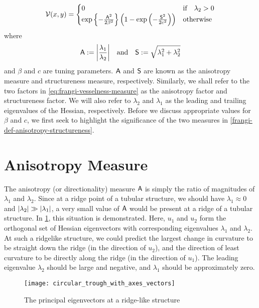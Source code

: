 \begin{equation} \label{eq:frangi-vesselness-measure}
\V(x,y) = \begin{cases}
0 & \text{if} \quad \lambda_2 > 0 \\
\exp\left\{-\frac{\Am^2}{2\beta^2}\right\}
\left(1 - \exp\left(-\frac{\Sm^2}{2c^2}\right)\right) & \text{otherwise}
\end{cases} \end{equation}
where
\begin{equation} \label{frangi-def-anisotropy-structureness}
\Am := \abs*{\frac{\lambda_1}{\lambda_2}}
\quad \textrm{and} \quad 
\Sm := \sqrt{\lambda_1^2 + \lambda_2^2}
\end{equation}
and $\beta$ and $c$ are tuning parameters. $\Am$ and $\Sm$ are known as the anisotropy measure and structureness measure, respectively. Similarly, we shall refer to the two factors in \cref{eq:frangi-vesselness-measure} as the anisotropy factor and structureness factor. We will also refer to $\lambda_2$ and $\lambda_1$ as the leading and trailing eigenvalues of the Hessian, respectively. Before we discuss appropriate values for $\beta$ and $c$, we first seek to highlight the significance of the two measures in \cref{frangi-def-anisotropy-structureness}.

\section{Anisotropy Measure} \label{sec:frangi.anisotropy}
The anisotropy (or directionality) measure $\Am$ is simply the ratio of magnitudes of $\lambda_1$ and $\lambda_2$. Since at a ridge point of a tubular structure, we should have $\lambda_1 \approx 0$ and $\abs*{\lambda_2} \gg \abs*{\lambda_1}$,
a very small value of $\Am$ would be present at a ridge of a tubular structure.
In \cref{fig:circular_trough_with_axes_vectors}, this situation is demonstrated. Here, $u_1$ and $u_2$ form the orthogonal set of Hessian eigenvectors with corresponding eigenvalues $\lambda_1$ and $\lambda_2$. At such a ridgelike structure, we could predict the largest change in curvature to be straight down the ridge (in the direction of $u_2$), and the direction of least curvature to be directly along the ridge (in the direction  of $u_1$). The leading eigenvalue $\lambda_2$ should be large and negative, and $\lambda_1$ should be approximately zero.

\begin{figure} \centering
  \texttt{[image: circular\_trough\_with\_axes\_vectors]}\\[12pt]
  \caption{The principal eigenvectors at a ridge-like structure} 
  \label{fig:circular_trough_with_axes_vectors}
\end{figure}


